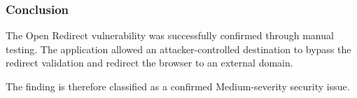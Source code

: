 \subsubsection*{Conclusion}

The Open Redirect vulnerability was successfully confirmed through
manual testing. The application allowed an attacker-controlled
destination to bypass the redirect validation and redirect the
browser to an external domain.

The finding is therefore classified as a confirmed Medium-severity
security issue.